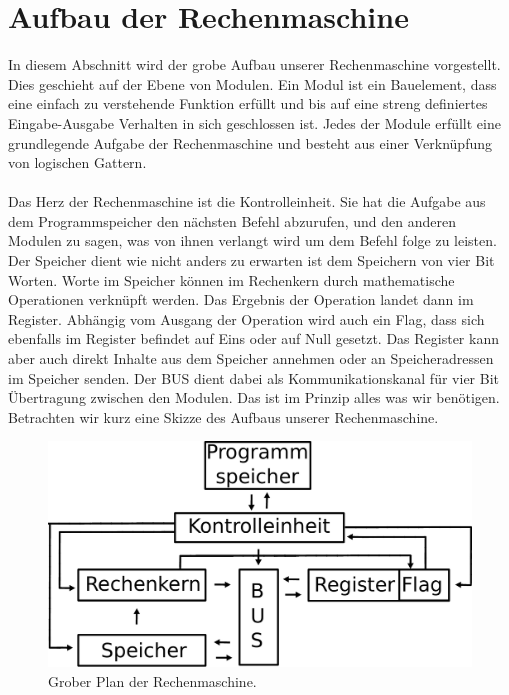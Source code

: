 \documentclass[11pt,a4paper,leqno]{report}
\numberwithin{equation}{chapter}
\begin{document}
\section{Aufbau der Rechenmaschine}
In diesem Abschnitt wird der grobe Aufbau unserer Rechenmaschine vorgestellt. Dies geschieht auf der Ebene von Modulen. Ein Modul ist ein Bauelement, dass eine einfach zu verstehende Funktion erf\"ullt und bis auf eine streng definiertes Eingabe-Ausgabe Verhalten in sich geschlossen ist. Jedes der Module erf\"ullt eine grundlegende Aufgabe der Rechenmaschine und besteht aus einer Verkn\"upfung von logischen Gattern.\\
\\
Das Herz der Rechenmaschine ist die Kontrolleinheit. Sie hat die Aufgabe aus dem Programmspeicher den n\"achsten Befehl abzurufen, und den anderen Modulen zu sagen, was von ihnen verlangt wird um dem Befehl folge zu leisten. Der Speicher dient wie nicht anders zu erwarten ist dem Speichern von vier Bit Worten. Worte im Speicher k\"onnen im Rechenkern durch mathematische Operationen verkn\"upft werden. Das Ergebnis der Operation landet dann im Register. Abh\"angig vom Ausgang der Operation wird auch ein Flag, dass sich ebenfalls im Register befindet auf Eins oder auf Null gesetzt.
Das Register kann aber auch direkt Inhalte aus dem Speicher annehmen oder an Speicheradressen im Speicher senden. Der BUS dient dabei als Kommunikationskanal f\"ur vier Bit \"Ubertragung zwischen den Modulen. Das ist im Prinzip alles was wir ben\"otigen. Betrachten wir kurz eine Skizze des Aufbaus unserer Rechenmaschine.
\begin{figure}[H]
	\begin{center}
		\includegraphics[scale=0.5]{Bilder/Plan.pdf}
		\caption{Grober Plan der Rechenmaschine.}
	\end{center}
\end{figure}
\end{document}
